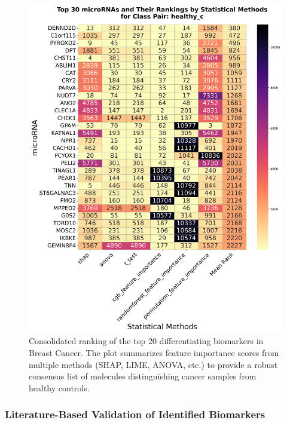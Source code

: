 \documentclass[journal]{IEEEtran}
\begin{document}
\begin{figure}[htbp]
\centering
\includegraphics[width=\linewidth]{breast_cancer_figures/summary/summary_of_statistical_methods_plot.png}
\caption{Consolidated ranking of the top 20 differentiating biomarkers in Breast Cancer. The plot summarizes feature importance scores from multiple methods (SHAP, LIME, ANOVA, etc.) to provide a robust consensus list of molecules distinguishing cancer samples from healthy controls.}
\label{fig:breast_biomarker_summary}
\end{figure}

\subsubsection{Literature-Based Validation of Identified Biomarkers}
\end{document}

